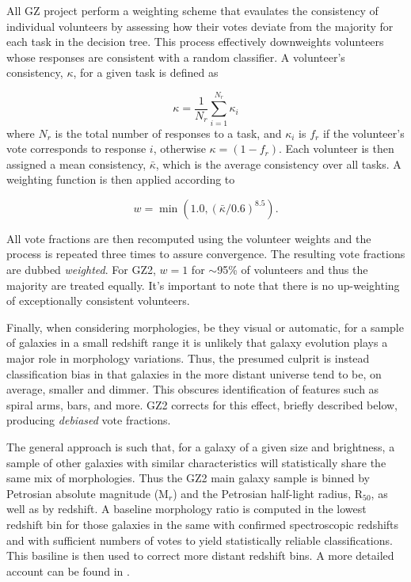 All GZ project perform a weighting scheme that evaulates the consistency of individual volunteers by assessing how their votes deviate from the majority for each task in the decision tree. This process effectively downweights volunteers whose responses are consistent with a random classifier. A volunteer's consistency, $\kappa$, for a given task is defined as 

\begin{equation}
\kappa = \frac{1}{N_r}\sum_{i=1}^{N_r}{\kappa_i}
\end{equation}
where $N_r$ is the total number of responses to a task, and $\kappa_i$ is $f_r$ if the volunteer's vote corresponds to response $i$, otherwise $\kappa=(1-f_r)$. Each volunteer is then assigned a mean consistency, $\bar\kappa$, which is the average consistency over all tasks. A weighting function is then applied according to  

\begin{equation}
w = \min({1.0, (\bar\kappa/0.6)^{8.5}}).
\end{equation}

All vote fractions are then recomputed using the volunteer weights and the process is repeated three times to assure convergence. The resulting vote fractions are dubbed \textit{weighted}. For GZ2, $w=1$ for $\sim$95\% of volunteers and thus the majority are treated equally. It's important to note that there is no up-weighting of exceptionally consistent volunteers.


Finally, when considering morphologies, be they visual or automatic, for a sample of galaxies in a small redshift range it is unlikely that galaxy evolution plays a major role in morphology variations. Thus, the presumed culprit is instead classification bias in that galaxies in the more distant universe tend to be, on average, smaller and dimmer. This obscures identification of features such as spiral arms, bars, and more. GZ2 corrects for this effect, briefly described below, producing \textit{debiased} vote fractions.

The general approach is such that, for a galaxy of a given size and brightness, a sample of other galaxies with similar characteristics will statistically share the same mix of morphologies. Thus the GZ2 main galaxy sample is binned by Petrosian absolute magnitude (M$_r$) and the Petrosian half-light radius, R$_{50}$,  as well as by redshift. A baseline morphology ratio is computed in the lowest redshift bin for those galaxies in the same with confirmed spectroscopic redshifts and with sufficient numbers of votes to yield statistically reliable classifications. This basiline is then used to correct more distant redshift bins. A more detailed account can be found in \cite{Willett2013}.


